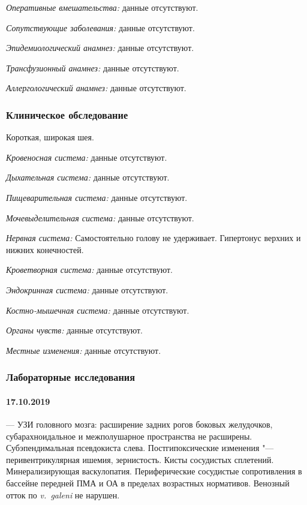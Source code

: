 \documentclass[a4paper,14pt]{extarticle}
\begin{document}
\emph{Оперативные вмешательства:} данные отсутствуют.

\emph{Сопутствующие заболевания:} данные отсутствуют.

\emph{Эпидемиологический анамнез:} данные отсутствуют.

\emph{Трансфузионный анамнез:} данные отсутствуют.

\emph{Аллергологический анамнез:} данные отсутствуют.

\subsubsection*{Клиническое обследование}

Короткая, широкая шея.

\emph{Кровеносная система:} данные отсутствуют.

\emph{Дыхательная система:} данные отсутствуют.

\emph{Пищеварительная система:} данные отсутствуют.

\emph{Мочевыделительная система:} данные отсутствуют.

\emph{Нервная система:} Самостоятельно голову не удерживает. Гипертонус верхних и нижних конечностей.

\emph{Кроветворная система:} данные отсутствуют.

\emph{Эндокринная система:} данные отсутствуют.

\emph{Костно-мышечная система:} данные отсутствуют.

\emph{Органы чувств:} данные отсутствуют.

\emph{Местные изменения:} данные отсутствуют.

\subsubsection*{Лабораторные исследования}

\paragraph{17.10.2019} --- УЗИ головного мозга: расширение задних рогов боковых желудочков, субарахноидальное и межполушарное пространства не расширены. Субэпендимальная псевдокиста слева. Постгипоксические изменения "--- перивентрикулярная ишемия, зернистость. Кисты сосудистых сплетений. Минерализирующая васкулопатия. Периферические сосудистые сопротивления в бассейне передней ПМА и ОА в пределах возрастных нормативов. Венозный отток по \textit{v.~galeni} не нарушен.
\end{document}
